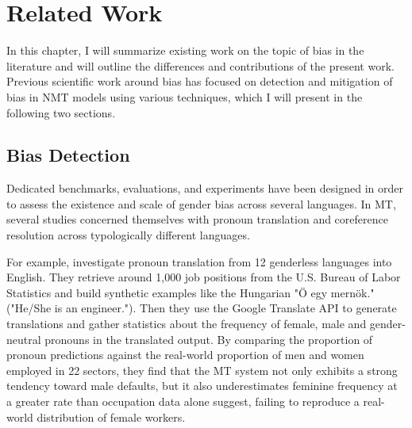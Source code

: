 \chapter{Related Work}
\label{ch:Related_work}



In this chapter, I will summarize existing work on the topic of bias in the literature and will outline the differences and contributions of the present work. Previous scientific work around bias has focused on detection and mitigation of bias in NMT models using various techniques, which I will present in the following two sections.  %

\section{Bias Detection}
\label{sec:Background:Bias_Detection}

Dedicated benchmarks, evaluations, and experiments have been designed in order to assess the existence and scale of gender bias across several languages. In MT, several studies concerned themselves with pronoun translation and coreference resolution across typologically different languages. 

For example, \citet{Prates_2019} investigate pronoun translation from 12 genderless languages into English. They retrieve around 1,000 job positions from the U.S. Bureau of Labor Statistics and build synthetic examples like the Hungarian "Ö egy mernök." ("He/She is an engineer."). Then they use the Google Translate API to generate translations and gather statistics about the frequency of female, male and gender-neutral pronouns in the translated output. By comparing the proportion of pronoun predictions against the real-world proportion of men and women employed in 22 sectors, they find that the MT system not only exhibits a strong tendency toward male defaults, but it also underestimates feminine frequency at a greater rate than occupation data alone suggest, failing to reproduce a real-world distribution of female workers.


